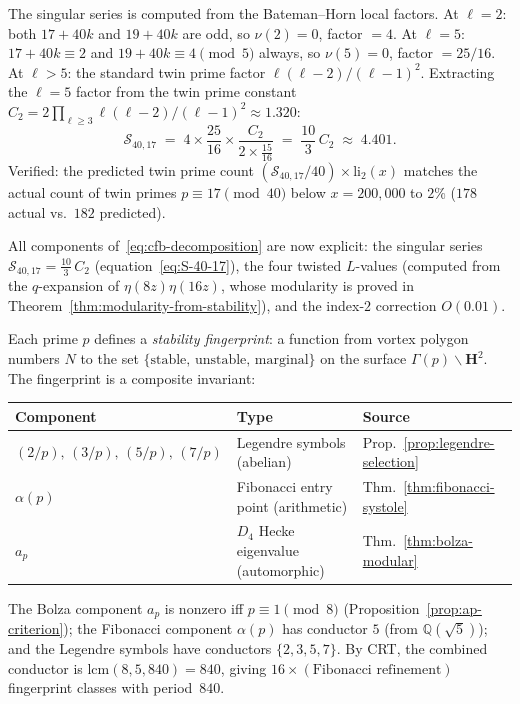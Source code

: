 \begin{remark}
\noindent
The singular series is computed from the Bateman--Horn
local factors.
At $\ell = 2$: both $17{+}40k$ and $19{+}40k$ are odd, so
$\nu(2) = 0$, factor $= 4$.
At $\ell = 5$: $17{+}40k \equiv 2$ and $19{+}40k \equiv 4
\pmod{5}$ always, so $\nu(5) = 0$, factor $= 25/16$.
At $\ell > 5$: the standard twin prime factor
$\ell(\ell{-}2)/(\ell{-}1)^2$.
Extracting the $\ell = 5$ factor from the twin prime
constant $C_2 = 2\prod_{\ell \ge 3}
\ell(\ell{-}2)/(\ell{-}1)^2 \approx 1.320$:
\begin{equation}\label{eq:S-40-17}
  \mathcal{S}_{40,17}
  \;=\; 4 \times \frac{25}{16} \times
  \frac{C_2}{2 \times \frac{15}{16}}
  \;=\; \frac{10}{3}\,C_2
  \;\approx\; 4.401.
\end{equation}
Verified: the predicted twin prime count
$(\mathcal{S}_{40,17}/40) \times \mathrm{li}_2(x)$ matches
the actual count of twin primes $p \equiv 17 \pmod{40}$
below $x = 200{,}000$ to $2\%$
($178$ actual vs.\ $182$ predicted).

All components of~\eqref{eq:cfb-decomposition} are now
explicit: the singular series $\mathcal{S}_{40,17} =
\tfrac{10}{3}\,C_2$ (equation~\eqref{eq:S-40-17}),
the four twisted $L$-values (computed from the
$q$-expansion of $\eta(8z)\eta(16z)$, whose modularity
is proved in Theorem~\ref{thm:modularity-from-stability}),
and the index-$2$ correction $O(0.01)$.
\end{remark}

\begin{remark}
\label{rmk:fingerprint}
Each prime $p$ defines a \emph{stability fingerprint}: a function
from vortex polygon numbers $N$ to the set
$\{\text{stable, unstable, marginal}\}$ on the surface
$\Gamma(p)\backslash\mathbf{H}^2$.
The fingerprint is a composite invariant:
\begin{center}
\begin{tabular}{lll}
\toprule
Component & Type & Source \\
\midrule
$(2/p),\,(3/p),\,(5/p),\,(7/p)$ &
  Legendre symbols (abelian) &
  Prop.~\ref{prop:legendre-selection} \\
$\alpha(p)$ &
  Fibonacci entry point (arithmetic) &
  Thm.~\ref{thm:fibonacci-systole} \\
$a_p$ &
  $D_4$ Hecke eigenvalue (automorphic) &
  Thm.~\ref{thm:bolza-modular} \\
\bottomrule
\end{tabular}
\end{center}
The Bolza component $a_p$ is nonzero iff $p \equiv 1 \pmod{8}$
(Proposition~\ref{prop:ap-criterion}); the Fibonacci component
$\alpha(p)$ has conductor $5$ (from $\mathbb{Q}(\sqrt{5})$);
and the Legendre symbols have conductors $\{2, 3, 5, 7\}$.
By CRT, the combined conductor is $\mathrm{lcm}(8, 5, 840) = 840$,
giving $16 \times (\text{Fibonacci refinement})$ fingerprint
classes with period~$840$.
\end{remark}

